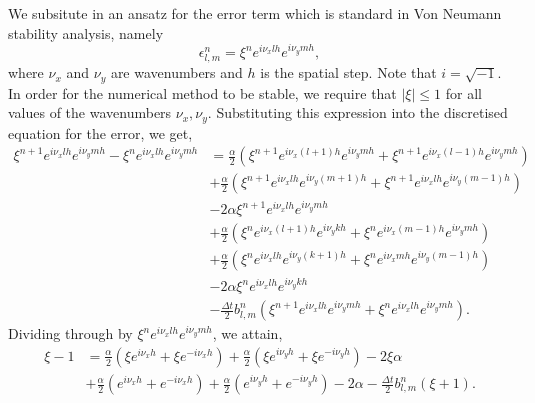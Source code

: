 We subsitute in an ansatz for the error term which is standard in Von Neumann stability analysis, namely
\begin{equation*}
    \epsilon_{l,m}^n = \xi^n e^{i \nu_x l h} e^{i \nu_y m h},
\end{equation*}
where $\nu_x$ and $\nu_y$ are wavenumbers and $h$ is the spatial step. Note that $i = \sqrt{-1}$. In order for the numerical
method to be stable, we require that $|\xi| \leq 1$ for all values of the wavenumbers $\nu_x, \nu_y$.
Substituting this expression into the discretised equation for the error, we get,
\begin{equation*}
    \begin{split}
        \xi^{n+1} e^{i \nu_x l h} e^{i \nu_y m h} - \xi^{n} e^{i \nu_x l h} e^{i \nu_y m h} &=
       \frac{\alpha}{2}  \left( \xi^{n+1} e^{i \nu_x (l+1) h} e^{i \nu_y m h} + \xi^{n+1} e^{i \nu_x (l-1) h} e^{i \nu_y m h} \right) \\
       &+ \frac{\alpha}{2}\left( \xi^{n+1} e^{i \nu_x l h} e^{i \nu_y (m+1) h} + \xi^{n+1} e^{i \nu_x l h} e^{i \nu_y (m-1) h}  \right) \\
       &-2 \alpha\xi^{n+1} e^{i \nu_x l h} e^{i \nu_y m h}  \\
       &+\frac{\alpha}{2} \left( \xi^{n} e^{i \nu_x (l+1) h} e^{i \nu_y k h}+ \xi^{n} e^{i \nu_x (m-1) h} e^{i \nu_y m h}\right) \\
       &+ \frac{\alpha}{2}\left(\xi^{n} e^{i \nu_x l h} e^{i \nu_y (k+1) h} + \xi^{n} e^{i \nu_x m h} e^{i \nu_y (m-1) h}  \right) \\
       &-2 \alpha \xi^{n} e^{i \nu_x l h} e^{i \nu_y k h}\\
       &-\frac{\Delta t}{2} b_{l,m}^{n} (\xi^{n+1} e^{i \nu_x l h} e^{i \nu_y m h} + \xi^{n} e^{i \nu_x l h} e^{i \nu_y m h}).
    \end{split}
\end{equation*}
Dividing through by $\xi^{n} e^{i \nu_x l h} e^{i \nu_y m h}$, we attain,
\begin{equation*}
    \begin{split}
        \xi - 1 &=
       \frac{\alpha}{2}  \left( \xi e^{i \nu_x h}+ \xi e^{-i \nu_x h} \right) 
       + \frac{\alpha}{2}\left( \xi  e^{i \nu_y h} + \xi  e^{-i \nu_y h}  \right) 
       -2 \xi \alpha  \\
       &+\frac{\alpha}{2} \left(  e^{i \nu_x  h}+  e^{-i \nu_x h}\right)
       + \frac{\alpha}{2}\left(   e^{i \nu_y h} +   e^{-i \nu_y  h}  \right) 
       -2 \alpha
       -\frac{\Delta t}{2} b_{l,m}^{n} (\xi + 1).
    \end{split}
\end{equation*}
